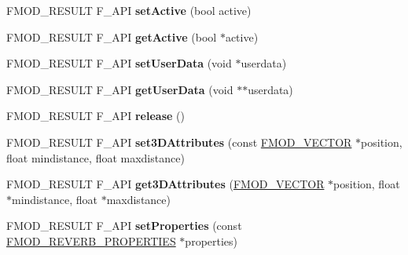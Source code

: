 \begin{DoxyCompactItemize}
\item 
\hypertarget{class_f_m_o_d_1_1_reverb3_d_ad645e360dfba70bf521f7258370a4028}{F\+M\+O\+D\+\_\+\+R\+E\+S\+U\+L\+T F\+\_\+\+A\+P\+I {\bfseries set\+Active} (bool active)}\label{class_f_m_o_d_1_1_reverb3_d_ad645e360dfba70bf521f7258370a4028}

\item 
\hypertarget{class_f_m_o_d_1_1_reverb3_d_afc78687f3aec76b996218fa22e0c25cb}{F\+M\+O\+D\+\_\+\+R\+E\+S\+U\+L\+T F\+\_\+\+A\+P\+I {\bfseries get\+Active} (bool $\ast$active)}\label{class_f_m_o_d_1_1_reverb3_d_afc78687f3aec76b996218fa22e0c25cb}

\item 
\hypertarget{class_f_m_o_d_1_1_reverb3_d_a7e4d0fb62d33f2cbca23e38998f8e53c}{F\+M\+O\+D\+\_\+\+R\+E\+S\+U\+L\+T F\+\_\+\+A\+P\+I {\bfseries set\+User\+Data} (void $\ast$userdata)}\label{class_f_m_o_d_1_1_reverb3_d_a7e4d0fb62d33f2cbca23e38998f8e53c}

\item 
\hypertarget{class_f_m_o_d_1_1_reverb3_d_a6acd23caa1ebbee25749bd390280d045}{F\+M\+O\+D\+\_\+\+R\+E\+S\+U\+L\+T F\+\_\+\+A\+P\+I {\bfseries get\+User\+Data} (void $\ast$$\ast$userdata)}\label{class_f_m_o_d_1_1_reverb3_d_a6acd23caa1ebbee25749bd390280d045}

\item 
\hypertarget{class_f_m_o_d_1_1_reverb3_d_a727b122d300135459a2f1cd59d0d7941}{F\+M\+O\+D\+\_\+\+R\+E\+S\+U\+L\+T F\+\_\+\+A\+P\+I {\bfseries release} ()}\label{class_f_m_o_d_1_1_reverb3_d_a727b122d300135459a2f1cd59d0d7941}

\item 
\hypertarget{class_f_m_o_d_1_1_reverb3_d_aaeb05688174876fec05c1f3bc0576be8}{F\+M\+O\+D\+\_\+\+R\+E\+S\+U\+L\+T F\+\_\+\+A\+P\+I {\bfseries set3\+D\+Attributes} (const \hyperlink{struct_f_m_o_d___v_e_c_t_o_r}{F\+M\+O\+D\+\_\+\+V\+E\+C\+T\+O\+R} $\ast$position, float mindistance, float maxdistance)}\label{class_f_m_o_d_1_1_reverb3_d_aaeb05688174876fec05c1f3bc0576be8}

\item 
\hypertarget{class_f_m_o_d_1_1_reverb3_d_a0778c0c504ff5c3d4e5e2b8e66e9c31d}{F\+M\+O\+D\+\_\+\+R\+E\+S\+U\+L\+T F\+\_\+\+A\+P\+I {\bfseries get3\+D\+Attributes} (\hyperlink{struct_f_m_o_d___v_e_c_t_o_r}{F\+M\+O\+D\+\_\+\+V\+E\+C\+T\+O\+R} $\ast$position, float $\ast$mindistance, float $\ast$maxdistance)}\label{class_f_m_o_d_1_1_reverb3_d_a0778c0c504ff5c3d4e5e2b8e66e9c31d}

\item 
\hypertarget{class_f_m_o_d_1_1_reverb3_d_a567c38962a1063fdfa74353b7991ed89}{F\+M\+O\+D\+\_\+\+R\+E\+S\+U\+L\+T F\+\_\+\+A\+P\+I {\bfseries set\+Properties} (const \hyperlink{struct_f_m_o_d___r_e_v_e_r_b___p_r_o_p_e_r_t_i_e_s}{F\+M\+O\+D\+\_\+\+R\+E\+V\+E\+R\+B\+\_\+\+P\+R\+O\+P\+E\+R\+T\+I\+E\+S} $\ast$properties)}\label{class_f_m_o_d_1_1_reverb3_d_a567c38962a1063fdfa74353b7991ed89}


\end{DoxyCompactItemize}

